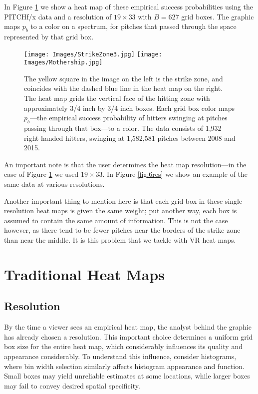 In Figure \ref{fig:ms} we show a heat map of these empirical success probabilities using the PITCHf/x\textsuperscript{\textregistered} data and a resolution of $19 \times 33$ with $B = 627$ grid boxes. The graphic maps $p_{b}$ to a color on a spectrum, for pitches that passed through the space represented by that grid box.
  \begin{figure}[H]
	\centering
	\texttt{[image: Images/StrikeZone3.jpg]} 
	\texttt{[image: Images/Mothership.jpg]} 
  \caption{The yellow square in the image on the left is the strike zone, and coincides with the dashed blue line in the heat map on the right. The heat map grids the vertical face of the hitting zone with approximately 3/4 inch by 3/4 inch boxes. Each grid box color maps $p_{b}$---the empirical success probability of hitters swinging at pitches passing through that box---to a color.  The data consists of 1,932 right handed hitters, swinging at 1,582,581 pitches between 2008 and 2015.}
  \label{fig:ms}
	\end{figure} 
An important note is that the user determines the heat map resolution---in the case of Figure \ref{fig:ms} we used $19 \times 33$. In Figure \ref{fig:6res} we show an example of the same data at various resolutions. 

Another important thing to mention here is that each grid box in these single-resolution heat maps is given the same weight; put another way, each box is assumed to contain the same amount of information. This is not the case however, as there tend to be fewer pitches near the borders of the strike zone than near the middle. It is this problem that we tackle with VR heat maps.

\section{Traditional Heat Maps} \label{THM}

\subsection{Resolution} %

By the time a viewer sees an empirical heat map, the analyst behind the graphic has already chosen a resolution. This important choice determines a uniform grid box size for the entire heat map, which considerably influences its quality and appearance considerably. To understand this influence, consider histograms, where bin width selection similarly affects histogram appearance and function. Small boxes may yield unreliable estimates at some locations, while larger boxes may fail to convey desired spatial specificity. 

